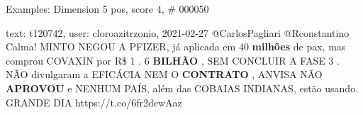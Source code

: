 \begin{frame}{Examples: Dimension 5 pos, score 4, \# 000050}
\footnotesize
\begin{exampleblock}{text: t120742, user: cloroazitrzonio, 2021-02-27}
@CarlosPagliari @Rconstantino Calma! MINTO NEGOU A PFIZER, já aplicada em 40 
\textbf{milhões} de pax, mas comprou COVAXIN por R\$ 1 . 6 \textbf{BILHÃO} , 
SEM CONCLUIR A FASE 3 . NÃO divulgaram a EFICÁCIA NEM O \textbf{CONTRATO} , 
ANVISA NÃO \textbf{APROVOU} e NENHUM PAÍS, além das COBAIAS INDIANAS, estão 
usando. GRANDE DIA  
https://t.co/6fr2dewAaz 
\end{exampleblock}
\end{frame}
